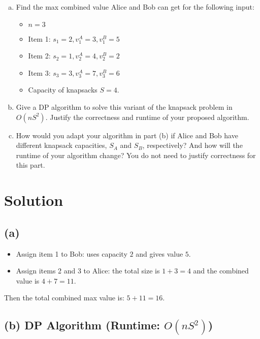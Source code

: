 \documentclass[11pt]{article}
\begin{document}
\begin{tcolorbox}[title={Problem 1 (Knapsack, Take II, 50 pts)}]
        \begin{enumerate}[(a)]
            \item Find the max combined value Alice and Bob can get for the following input:
            \begin{itemize}
                \item \( n = 3 \)
                \item Item 1: \( s_1 = 2, v_1^A = 3, v_1^B = 5 \)
                \item Item 2: \( s_2 = 1, v_2^A = 4, v_2^B = 2 \)
                \item Item 3: \( s_3 = 3, v_3^A = 7, v_3^B = 6 \)
                \item Capacity of knapsacks \(S = 4\).
            \end{itemize} 
            \item Give a DP algorithm to solve this variant of the knapsack problem in $O(nS^2)$. Justify the correctness and runtime of your proposed algorithm. 
            \item How would you adapt your algorithm in part (b) if Alice and Bob have different knapsack capacities, \(S_A\) and \(S_B\), respectively? And how will the runtime of your algorithm change? You do not need to justify correctness for this part.
        \end{enumerate}
    \end{tcolorbox}

    \section*{Solution}

    \subsection*{(a)}
    \begin{itemize}
        \item Assign item 1 to Bob: uses capacity \(2\) and gives value \(5\).
        \item Assign items 2 and 3 to Alice: the total size is \(1+3=4\) and the combined value is \(4+7=11\).
    \end{itemize}
    Then the total combined max value is: \(5 + 11 = 16\).
    
    \subsection*{(b) DP Algorithm (Runtime: \(O(nS^2)\))}
    
\end{document}
